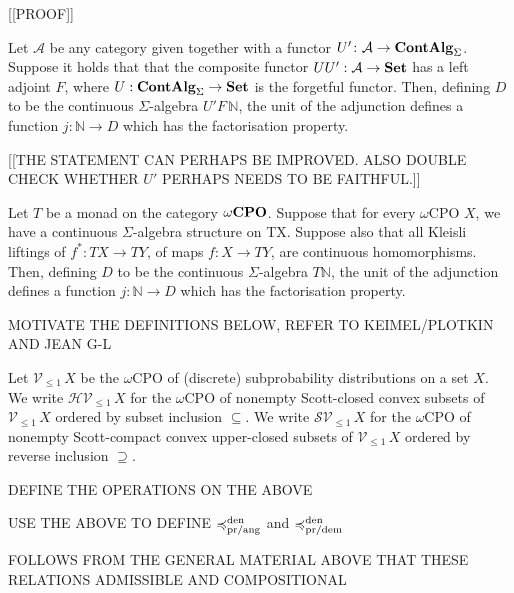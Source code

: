 [[PROOF]]

\begin{lemma}
Let $\mathcal{A}$ be any category given together with a functor $U' \colon \mathcal{A} \to \mathbf{ContAlg}_\Sigma$.
Suppose it holds that that the
composite functor $UU' : \mathcal{A} \to \mathbf{Set}$ has a left adjoint $F$, where $U: \mathbf{ContAlg}_\Sigma \to \mathbf{Set}$ is the forgetful functor.
Then, defining $D$ to be the continuous $\Sigma$-algebra $U' F \, \mathbb{N}$, the unit of the adjunction defines a function
$j \colon \mathbb{N} \to D$ which has the factorisation property.
\end{lemma}

[[THE STATEMENT CAN PERHAPS BE IMPROVED. ALSO DOUBLE CHECK WHETHER $U'$ PERHAPS NEEDS TO BE FAITHFUL.]]


\begin{lemma}
Let $T$ be a monad on the category $\mathbf{{\omega}CPO}$.  Suppose that for every $\omega$CPO $X$, we have a 
continuous $\Sigma$-algebra structure on TX. Suppose also that all Kleisli liftings of 
$f^* \colon TX \to TY$, of maps $f \colon X \to TY$, are  continuous  homomorphisms. Then,
defining $D$ to be the continuous $\Sigma$-algebra $T \mathbb{N}$, the unit of the adjunction defines a function
$j \colon \mathbb{N} \to D$ which has the factorisation property.
\end{lemma}

MOTIVATE THE DEFINITIONS BELOW, REFER TO KEIMEL/PLOTKIN AND JEAN G-L

Let $\mathcal{V}_{\leq 1} \,X$ be the $\omega$CPO of (discrete) subprobability distributions on a set $X$.
We write $\mathcal{H}\mathcal{V}_{\leq 1} \,X$ for the $\omega$CPO of nonempty Scott-closed convex subsets
of  $\mathcal{V}_{\leq 1} \,X$  ordered by subset inclusion $\subseteq$. 
We write $\mathcal{S}\mathcal{V}_{\leq 1} \,X$ for the $\omega$CPO of nonempty Scott-compact convex upper-closed subsets
of  $\mathcal{V}_{\leq 1} \,X$  ordered by reverse inclusion $\supseteq$.

DEFINE THE OPERATIONS ON THE ABOVE

USE THE ABOVE TO DEFINE $\preccurlyeq^{\text{den}}_{\text{pr/ang}}$ and $\preccurlyeq^{\text{den}}_{\text{pr/dem}}$

FOLLOWS FROM THE GENERAL MATERIAL ABOVE THAT THESE RELATIONS ADMISSIBLE AND COMPOSITIONAL



